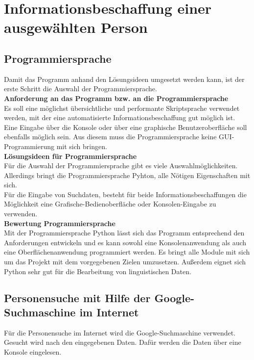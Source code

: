 
\chapter{Informationsbeschaffung einer ausgewählten Person}  %
\label{cha:Informationsbeschaffung einer ausgewählten Person} %

\section{Programmiersprache}
Damit das Programm anhand den Lösungsideen umgesetzt werden kann, ist der erste Schritt die Auswahl der Programmiersprache.\\
\textbf{Anforderung an das Programm bzw. an die Programmiersprache}\\
	Es soll eine möglichst übersichtliche und performante Skriptsprache verwendet werden, mit der eine automatisierte Informationsbeschaffung gut möglich ist. Eine Eingabe über die Konsole oder über eine graphische Benutzeroberfläche soll ebenfalls möglich sein. Aus diesem muss die Programmiersprache keine GUI-Programmierung mit sich bringen.\\
\textbf{Lösungsideen für Programmiersprache}\\
	Für die Auswahl der Programmiersprache gibt es viele Auswahlmöglichkeiten. Allerdings bringt die Programmiersprache Pyhton, alle Nötigen Eigenschaften mit sich.\\
	Für die Eingabe von Suchdaten, besteht für beide Informationsbeschaffungen die Möglichkeit eine Grafische-Bedienoberfläche oder Konsolen-Eingabe zu verwenden.\\
\textbf{Bewertung Programmiersprache}\\
	Mit der Programmiersprache Python lässt sich das Programm entsprechend den Anforderungen entwickeln und es kann sowohl eine Konsolenanwendung als auch eine Oberflächenanwendung programmiert werden. Es bringt alle Module mit sich um das Projekt mit dem vorgegebenen Zielen umzusetzen. Außerdem eignet sich Python sehr gut für die Bearbeitung von linguistischen Daten. \cite{bird2009natural}
\section{Personensuche mit Hilfe der Google-Suchmaschine im Internet}
Für die Personensuche im Internet wird die Google-Suchmaschine verwendet. Gesucht wird nach den eingegebenen Daten. Dafür werden die Daten über eine Konsole eingelesen.

